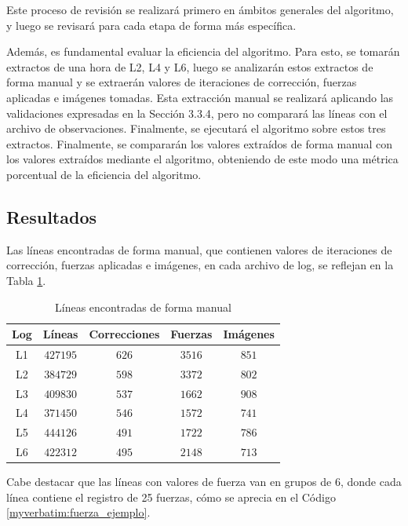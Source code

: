 Este proceso de revisión se realizará primero en ámbitos generales del algoritmo, y luego se revisará para cada etapa de forma más específica.

Además, es fundamental evaluar la eficiencia del algoritmo. Para esto, se tomarán extractos de una hora de L2, L4 y L6, luego se analizarán estos extractos de forma manual y se extraerán valores de iteraciones de corrección, fuerzas aplicadas e imágenes tomadas. Esta extracción manual se realizará aplicando las validaciones expresadas en la Sección 3.3.4, pero no comparará las líneas con el archivo de observaciones. Finalmente, se ejecutará el algoritmo sobre estos tres extractos.
Finalmente, se compararán los valores extraídos de forma manual con los valores extraídos mediante el algoritmo, obteniendo de este modo una métrica porcentual de la eficiencia del algoritmo.

\subsection{Resultados}

Las líneas encontradas de forma manual, que contienen valores de iteraciones de corrección, fuerzas aplicadas e imágenes, en cada archivo de log, se reflejan en la Tabla \ref{table:manual}.

\begin{table}[h]
    \centering
    \ttfamily
    \begin{tabular}{|c|c|c|c|c|}
        \hline
        Log & Líneas & Correcciones & Fuerzas & Imágenes \\
        \hline \hline
        L1 & $427195$ & $626$ & $3516$ & $851$ \\
        \hline
        L2 & $384729$ & $598$ & $3372$ & $802$ \\
        \hline
        L3 & $409830$ & $537$ & $1662$ & $908$ \\
        \hline
        L4 & $371450$ & $546$ & $1572$ & $741$ \\
        \hline
        L5 & $444126$ & $491$ & $1722$ & $786$ \\
        \hline
        L6 & $422312$ & $495$ & $2148$ & $713$ \\
        \hline
    \end{tabular}
    \caption{\label{table:manual} Líneas encontradas de forma manual}
\end{table}

Cabe destacar que las líneas con valores de fuerza van en grupos de 6, donde cada línea contiene el registro de 25 fuerzas, cómo se aprecia en el Código \ref{myverbatim:fuerza_ejemplo}.

